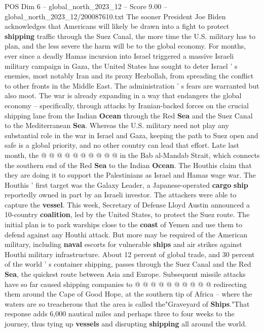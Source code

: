 \begin{textsample}{POS Dim 6 – global\_north\_2023\_12 – Score 9.00 – global\_north\_2023\_12/200087610.txt}  \label{ex:f6_pos_137}
The sooner President Joe Biden acknowledges that Americans will likely be drawn into a fight to protect \textbf{shipping} traffic through the Suez Canal, the more time the U.S. military has to plan, and the less severe the harm will be to the global economy.
For months, ever since a deadly Hamas incursion into Israel triggered a massive Israeli military campaign in Gaza, the United States has sought to deter Israel ' s enemies, most notably Iran and its proxy Hezbollah, from spreading the conflict to other fronts in the Middle East.
The administration ' s fears are warranted but also moot.
The war is already expanding in a way that endangers the global economy -- specifically, through attacks by Iranian-backed forces on the crucial shipping lane from the Indian \textbf{Ocean} through the Red \textbf{Sea} and the Suez Canal to the Mediterranean \textbf{Sea}.
Whereas the U.S. military need not play any substantial role in the war in Israel and Gaza, keeping the path to Suez open and safe is a global priority, and no other country can lead that effort.
Late last month, the @ @ @ @ @ @ @ @ @ @ in the Bab al-Mandab Strait, which connects the southern end of the Red \textbf{Sea} to the Indian \textbf{Ocean}.
The Houthis claim that they are doing it to support the Palestinians as Israel and Hamas wage war.
The Houthis ' first target was the Galaxy Leader, a Japanese-operated \textbf{cargo} \textbf{ship} reportedly owned in part by an Israeli investor.
The attackers were able to capture the \textbf{vessel}.
This week, Secretary of Defense Lloyd Austin announced a 10-country \textbf{coalition}, led by the United States, to protect the Suez route.
The initial plan is to park warships close to the \textbf{coast} of Yemen and use them to defend against any Houthi attack.
But more may be required of the American military, including \textbf{naval} escorts for vulnerable \textbf{ships} and air strikes against Houthi military infrastructure.
About 12 percent of global trade, and 30 percent of the world ' s container shipping, passes through the Suez Canal and the Red \textbf{Sea}, the quickest route between Asia and Europe.
Subsequent missile attacks have so far caused shipping companies to @ @ @ @ @ @ @ @ @ @ redirecting them around the Cape of Good Hope, at the southern tip of Africa -- where the waters are so treacherous that the area is called the"Graveyard of \textbf{Ships}."That response adds 6,000 nautical miles and perhaps three to four weeks to the journey, thus tying up \textbf{vessels} and disrupting \textbf{shipping} all around the world.

\end{textsample}
